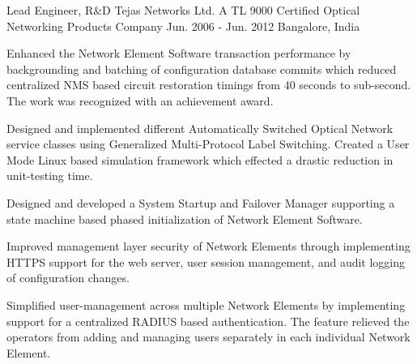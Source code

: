 \begin{cventries}
  \expentry
    {Lead Engineer, R\&D} %
    {Tejas Networks} {Ltd.} %
    {A TL 9000 Certified Optical Networking Products Company} %
    {Jun. 2006 - Jun. 2012} %
    {Bangalore, India} %
    {
      \begin{cvitems} %
        \item {Enhanced the Network Element Software transaction performance by backgrounding and batching of configuration database commits which reduced centralized NMS based circuit restoration timings from 40 seconds to sub-second. The work was recognized with an achievement award.}
        \item {Designed and implemented different Automatically Switched Optical Network service classes using Generalized Multi-Protocol Label Switching. Created a User Mode Linux based simulation framework which effected a drastic reduction in unit-testing time.}
	\item {Designed and developed a System Startup and Failover Manager supporting a state machine based phased initialization of Network Element Software.}
	\item {Improved management layer security of Network Elements through implementing HTTPS support for the web server, user session management, and audit logging of configuration changes.}
	\item {Simplified user-management across multiple Network Elements by implementing support for a centralized RADIUS based authentication. The feature relieved the operators from adding and managing users separately in each individual Network Element.}
      \end{cvitems}
    }

\end{cventries}
